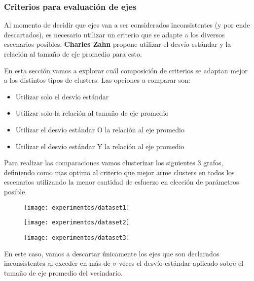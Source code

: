 \subsubsection{Criterios para evaluación de ejes}
Al momento de decidir que ejes van a ser considerados inconsistentes (y por ende descartados), es necesario utilizar un criterio que se adapte a los diversos escenarios posibles.
\textbf{Charles Zahn} propone utilizar el desvío estándar y la relación al tamaño de eje promedio para esto.

En esta sección vamos a explorar cuál composición de criterios se adaptan mejor a los distintos tipos de clusters. Las opciones a comparar son:

\begin{itemize}
\item Utilizar solo el desvío estándar
\item Utilizar solo la relación al tamaño de eje promedio
\item Utilizar el desvío estándar O la relación al eje promedio
\item Utilizar el desvío estándar Y la relación al eje promedio
\end{itemize}

Para realizar las comparaciones vamos clusterizar los siguientes 3 grafos, definiendo como mas optimo al criterio que mejor arme clusters en todos los escenarios utilizando la menor cantidad de esfuerzo en elección de parámetros posible.

\begin{figure}[H]
	\centering
	\begin{minipage}[t]{.3\textwidth}
		\centering
		\texttt{[image: experimentos/dataset1]}
	\end{minipage}\qquad
	\begin{minipage}[t]{.3\textwidth}
		\centering
		\texttt{[image: experimentos/dataset2]}
	\end{minipage}\qquad
	\begin{minipage}[t]{.3\textwidth}
		\centering
		\texttt{[image: experimentos/dataset3]}
	\end{minipage}
\end{figure}	


\vspace{10 pt}

En este caso, vamos a descartar únicamente los ejes que son declarados inconsistentes al exceder en más de $\sigma$ veces el desvío estándar aplicado sobre el tamaño de eje promedio del vecindario.

